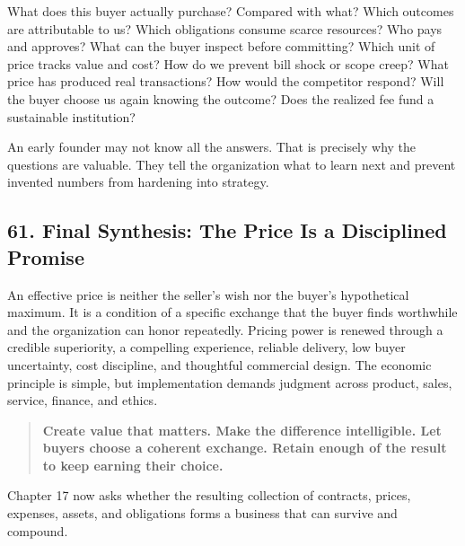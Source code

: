 What does this buyer actually purchase? Compared with what? Which outcomes are attributable to us? Which obligations consume scarce resources? Who pays and approves? What can the buyer inspect before committing? Which unit of price tracks value and cost? How do we prevent bill shock or scope creep? What price has produced real transactions? How would the competitor respond? Will the buyer choose us again knowing the outcome? Does the realized fee fund a sustainable institution?

An early founder may not know all the answers. That is precisely why the questions are valuable. They tell the organization what to learn next and prevent invented numbers from hardening into strategy.

\subsection*{61. Final Synthesis: The Price Is a Disciplined Promise}

An effective price is neither the seller's wish nor the buyer's hypothetical maximum. It is a condition of a specific exchange that the buyer finds worthwhile and the organization can honor repeatedly. Pricing power is renewed through a credible superiority, a compelling experience, reliable delivery, low buyer uncertainty, cost discipline, and thoughtful commercial design. The economic principle is simple, but implementation demands judgment across product, sales, service, finance, and ethics.

\begin{quote}
\textbf{Create value that matters. Make the difference intelligible. Let buyers choose a coherent exchange. Retain enough of the result to keep earning their choice.}
\end{quote}

Chapter 17 now asks whether the resulting collection of contracts, prices, expenses, assets, and obligations forms a business that can survive and compound.
